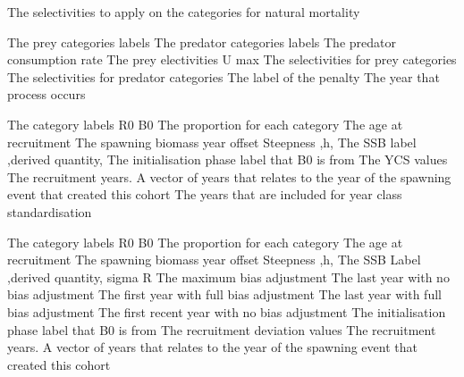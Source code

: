  {The selectivities to apply on the categories for natural mortality}
\par\textbf{}\par
{} {The prey categories labels}
 {The predator categories labels}
 {The predator consumption rate}
 {The prey electivities}
 {U max}
 {The selectivities for prey categories}
 {The selectivities for predator categories}
 {The label of the penalty}
 {The year that process occurs}
\par\textbf{}\par
{} {The category labels}
 {R0}
 {B0}
 {The proportion for each category}
 {The age at recruitment}
 {The spawning biomass year offset}
 {Steepness ,h,}
 {The SSB label ,derived quantity,}
 {The initialisation phase label that B0 is from}
 {The YCS values}
 {The recruitment years. A vector of years that relates to the year of the spawning event that created this cohort}
 {The years that are included for year class standardisation}
\par\textbf{}\par
{} {The category labels}
 {R0}
 {B0}
 {The proportion for each category}
 {The age at recruitment}
 {The spawning biomass year offset}
 {Steepness ,h,}
 {The SSB Label ,derived quantity,}
 {sigma R}
 {The maximum bias adjustment}
 {The last year with no bias adjustment}
 {The first year with full bias adjustment}
 {The last year with full bias adjustment}
 {The first recent year with no bias adjustment}
 {The initialisation phase label that B0 is from}
 {The recruitment deviation values}
 {The recruitment years. A vector of years that relates to the year of the spawning event that created this cohort}
